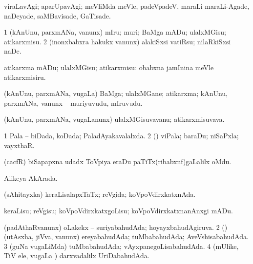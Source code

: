 \bentry
{}
\gl{\kirxvi}
\bmng
viraLavAgi; aparUpavAgi; meVliMda meVle, padeVpadeV, maraLi maraLi-Agade, naDeyade, saMBavisade, GaTisade. 
\emng
\eentry

\bentry
{}
\gl{\sakirx}
\bmng
\bnum
\num{1} (kAnUnu, parxmANa, \mo vanunx) mIru; muri; BaMga mADu; ulalxMGisu; atikarxmisu. 
\num{2} (inonxbabxra hakukx \mo vanunx) alakiSxsi vatiRsu; nilaRkiSxsi naDe. 
\enum
\emng

\noindent
\gl{\akirx}
\bmng
atikarxma mADu; ulalxMGisu; atikarxmisu:   obabxna jamInina meVle atikarxmisiru. 
\emng
\eentry

\bentry
{}
\gl{\nA}
\bmng
(kAnUnu, parxmANa, \mo vugaLa) BaMga; ulalxMGane; atikarxma; kAnUnu, parxmANa, \mo vanunx -- muriyuvudu, mIruvudu. 
\emng
\eentry

\bentry
{}
\gl{\nA}
\bmng
(kAnUnu, parxmANa, \mo vugaLanunx) ulalxMGisuvavanu; atikarxmisuvava. 
\emng
\eentry

\bentry
{}
\gl{\gu}
\bmng
\bnum
\num{1} Pala -- biDada, koDada; PaladAyakavalalxda. 
\num{2} (\rUpa) viPala; baraDu; niSaPxla; vayxthaR. 
\enum
\emng
\eentry

\bentry
{}
\gl{\nA}
\bmng
(cacfR) biSapapxna udadx ToVpiya eraDu paTiTx(ribabxnf)gaLalilx oMdu. 
\emng
\eentry

\bentry
{}
\gl{\gu}
\bmng
Alikeya AkArada. 
\emng
\eentry

\bentry
{}
\gl{\gu}
\bmng
(sAhitayxka) keraLisalapxTaTx; reVgida; koVpoVdirxkatxnAda. 
\emng
\eentry

\bentry
{}
\gl{\sakirx}
\bmng
keraLisu; reVgisu; koVpoVdirxkatxgoLisu; koVpoVdirxkatxnanAnxgi mADu. 
\emng
\eentry

\bentry
{}
\gl{\gu}
\bmng
(padAthaRvanunx) oLakekx -- suriyabahudAda; hoyayxbahudAgiruva. 
\bnum
\num{2} (\rUpa) (utAsxha, jiVva, \mo vanunx) ereyabahudAda; tuMbabahudAda; AveVshisabahudAda. 
\num{3} (guNa \mo vugaLiMda) tuMbabahudAda; vAyxpanegoLisabahudAda. 
\num{4} (mUlike, TiV ele, \mo vugaLa \vi) darxvadalilx UriDabahudAda. 
\enum
\emng
\eentry

